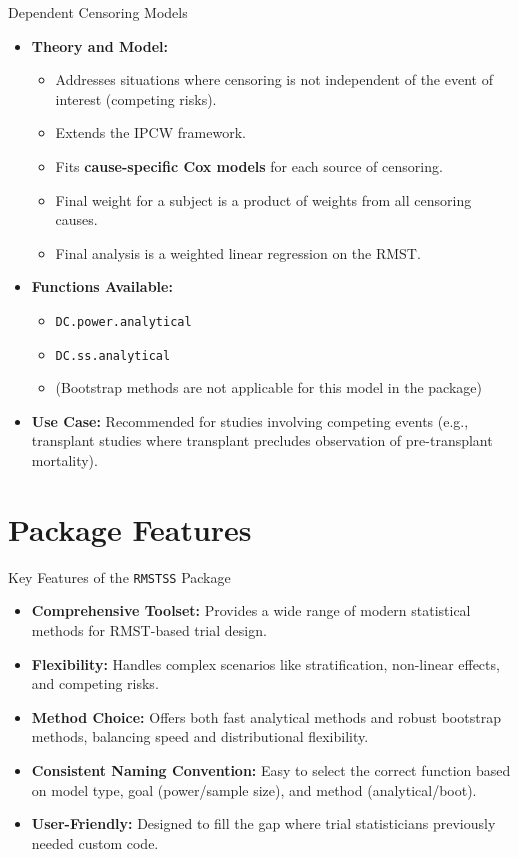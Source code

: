 \documentclass{beamer}
\begin{document}
\begin{frame}{Dependent Censoring Models}
\begin{itemize}
    \item \textbf{Theory and Model:}
    \begin{itemize}
        \item Addresses situations where censoring is not independent of the event of interest (competing risks).
        \item Extends the IPCW framework.
        \item Fits \textbf{cause-specific Cox models} for each source of censoring.
        \item Final weight for a subject is a product of weights from all censoring causes.
        \item Final analysis is a weighted linear regression on the RMST.
    \end{itemize}
    \item \textbf{Functions Available:}
    \begin{itemize}
        \item \texttt{DC.power.analytical}
        \item \texttt{DC.ss.analytical}
        \item (Bootstrap methods are not applicable for this model in the package)
    \end{itemize}
    \item \textbf{Use Case:} Recommended for studies involving competing events (e.g., transplant studies where transplant precludes observation of pre-transplant mortality).
\end{itemize}
\end{frame}

\section*{Package Features}
\begin{frame}{Key Features of the \texttt{RMSTSS} Package}
\begin{itemize}
    \item \textbf{Comprehensive Toolset:} Provides a wide range of modern statistical methods for RMST-based trial design.
    \item \textbf{Flexibility:} Handles complex scenarios like stratification, non-linear effects, and competing risks.
    \item  \textbf{Method Choice:} Offers both fast analytical methods and robust bootstrap methods, balancing speed and distributional flexibility.
    \item \textbf{Consistent Naming Convention:} Easy to select the correct function based on model type, goal (power/sample size), and method (analytical/boot).
    \item \textbf{User-Friendly:} Designed to fill the gap where trial statisticians previously needed custom code.
\end{itemize}
\end{frame}
\end{document}
